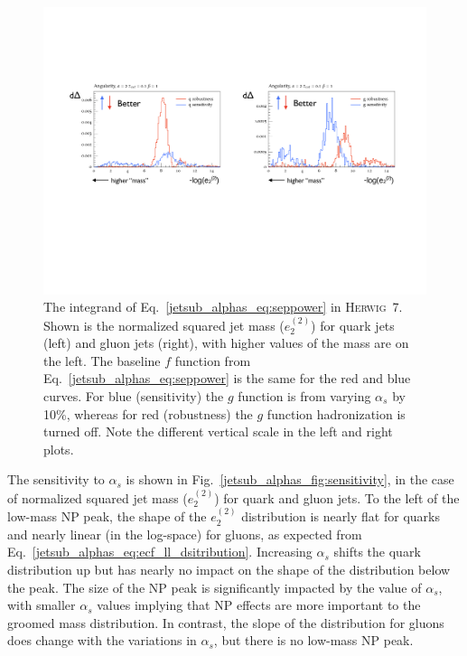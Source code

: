 \documentclass[11pt]{cernrep}
\begin{document}
\begin{figure}[t]
\begin{center}
\includegraphics[width = 0.99\columnwidth]{jetsub_alphas_differentialseparation2.pdf}
\end{center}
\caption{The integrand of Eq.~\eqref{jetsub_alphas_eq:seppower} in \textsc{Herwig~7}.  Shown is the normalized squared jet mass ($e_2^{(2)}$)  for quark jets (left) and gluon jets (right), with higher values of the mass are on the left.  The baseline $f$ function from Eq.~\eqref{jetsub_alphas_eq:seppower} is the same for the red and blue curves.  For blue (sensitivity) the $g$ function is from varying $\alpha_s$ by 10\%, whereas for red (robustness) the $g$ function hadronization is turned off.  Note the different vertical scale in the left and right plots. }
\label{jetsub_alphas_fig:differentialseparation}
\end{figure}

The sensitivity to $\alpha_s$ is shown in Fig.~\ref{jetsub_alphas_fig:sensitivity}, in the case of normalized squared jet mass ($e_2^{(2)}$) for quark and gluon jets.
%
To the left of the low-mass NP peak, the shape of the $e_2^{(2)}$ distribution is nearly flat for quarks and nearly linear (in the log-space) for gluons, as expected from Eq.~\eqref{jetsub_alphas_eq:ecf_ll_dsitribution}.
%
Increasing $\alpha_s$ shifts the quark distribution up but has nearly no impact on the shape of the distribution below the peak.
%
The size of the NP peak is significantly impacted by the value of $\alpha_s$, with smaller $\alpha_s$ values implying that NP effects are more important to the groomed mass distribution.
%
In contrast, the slope of the distribution for gluons does change with the variations in $\alpha_s$, but there is no low-mass NP peak.
\end{document}
